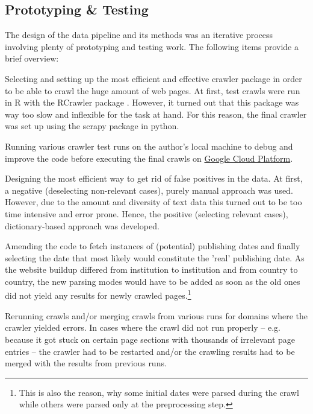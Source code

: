 \subsection{Prototyping \& Testing}
The design of the data pipeline and its methods was an iterative process involving plenty of prototyping and testing work. The following items provide a brief overview:
\begin{compactitem}
\item Selecting and setting up the most efficient and effective crawler package in order to be able to crawl the huge amount of web pages. At first, test crawls were run in R with the RCrawler package \parencite{Khalil2017}. However, it turned out that this package was way too slow and inflexible for the task at hand. For this reason, the final crawler was set up using the scrapy package \cite{Scrapy2018} in python. 
\item Running various crawler test runs on the author's local machine to debug and improve the code before executing the final crawls on \href{https://cloud.google.com/}{Google Cloud Platform}.
\item Designing the most efficient way to get rid of false positives in the data. At first, a negative (deselecting non-relevant cases), purely manual approach was used. However, due to the amount and diversity of text data this turned out to be too time intensive and error prone. Hence, the positive (selecting relevant cases), dictionary-based approach was developed.
\item Amending the code to fetch instances of (potential) publishing dates and finally selecting the date that most likely would constitute the 'real' publishing date. As the website buildup differed from institution to institution and from country to country, the new parsing modes would have to be added as soon as the old ones did not yield any results for newly crawled pages.\footnote{This is also the reason, why some initial dates were parsed during the crawl while others were parsed only at the preprocessing step.}
\item Rerunning crawls and/or merging crawls from various runs for domains where the crawler yielded errors. In cases where the crawl did not run properly – e.g. because it got stuck on certain page sections with thousands of irrelevant page entries – the crawler had to be restarted and/or the crawling results had to be merged with the results from previous runs. 
\end{compactitem}


